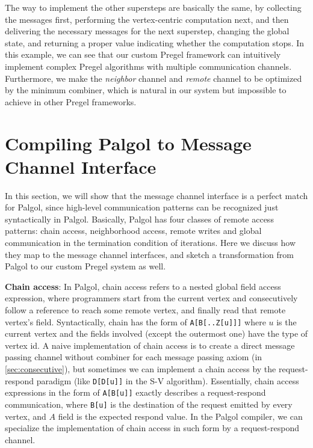 \documentclass{sokendai_thesis} %
\begin{document}
The way to implement the other supersteps are basically the same, by collecting the messages first, performing the vertex-centric computation next, and then delivering the necessary messages for the next superstep, changing the global state, and returning a proper value indicating whether the computation stops.
In this example, we can see that our custom Pregel framework can intuitively implement complex Pregel algorithms with multiple communication channels.
Furthermore, we make the \emph{neighbor} channel and \emph{remote} channel to be optimized by the minimum combiner, which is natural in our system but impossible to achieve in other Pregel frameworks.

\section{Compiling Palgol to Message Channel Interface}

In this section, we will show that the message channel interface is a perfect match for Palgol, since high-level communication patterns can be recognized just syntactically in Palgol.
Basically, Palgol has four classes of remote access patterns: chain access, neighborhood access, remote writes and global communication in the termination condition of iterations.
Here we discuss how they map to the message channel interfaces, and sketch a transformation from Palgol to our custom Pregel system as well.

\textbf{Chain access}: In Palgol, chain access refers to a nested global field access expression, where programmers start from the current vertex and consecutively follow a reference to reach some remote vertex, and finally read that remote vertex's field.
Syntactically, chain has the form of \texttt{A[B[..Z[u]]]} where $u$ is the current vertex and the fields involved (except the outermost one) have the type of vertex id.
A naive implementation of chain access is to create a direct message passing channel without combiner for each message passing axiom (in \autoref{sec:consecutive}), but sometimes we can implement a chain access by the request-respond paradigm (like \texttt{D[D[u]]} in the S-V algorithm).
Essentially, chain access expressions in the form of \texttt{A[B[u]]} exactly describes a request-respond communication, where \texttt{B[u]} is the destination of the request emitted by every vertex, and $A$ field is the expected respond value.
In the Palgol compiler, we can specialize the implementation of chain access in such form by a request-respond channel.
\end{document}
